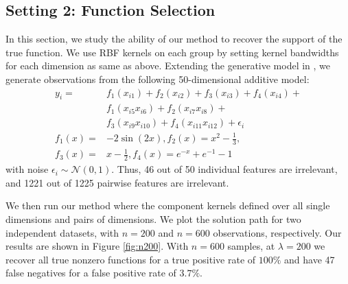 
\subsection{Setting 2: Function Selection}

In this section, we study the ability of our method to recover 
the support of the true function.
We use RBF kernels on each group by setting kernel bandwidths
for each dimension as same as above.
Extending the generative model in \cite{ravikumar09spam}, 
we generate observations from the following
50-dimensional additive model:
\begin{align*}
	y_i =& f_1(x_{i1}) + f_2(x_{i2}) + f_3(x_{i3}) + f_4(x_{i4}) + \\
&f_1(x_{i5}x_{i6}) + f_2(x_{i7}x_{i8}) + \\
&f_3(x_{i9}x_{i10}) + f_4(x_{i11}x_{i12}) + \epsilon_i \\
f_1(x) =& -2\sin(2x), f_2(x) = x^2 - \frac{1}{3}, \\
f_3(x)=& x-\frac{1}{2}, f_4(x) = e^{-x} + e^{-1} - 1
\end{align*}
with noise $\epsilon_i \sim \mathcal{N}(0,1)$.
Thus, 46 out of 50 individual features are irrelevant, and
1221 out of 1225 pairwise features are irrelevant.

We then run our method where the component kernels
defined over all single dimensions and pairs of dimensions.
We plot the solution path for two independent datasets, 
with $n=200$ and $n=600$ observations, respectively.
Our results are shown in Figure \ref{fig:n200}.
With $n=600$ samples, at $\lambda=200$ we recover all true nonzero functions for a true positive rate of $100\%$ and have 47 false negatives for a false positive rate of $3.7\%$.

